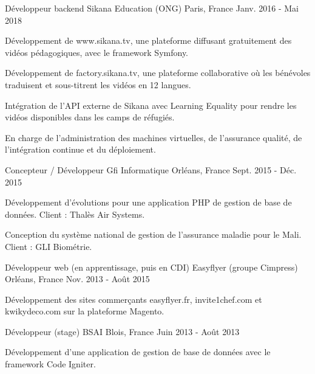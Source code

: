 \begin{cventries}
  \cventry
    {Développeur backend}
    {Sikana Education (ONG)}
    {Paris, France}
    {Janv. 2016 - Mai 2018}
    {
      \begin{cvitems}
        \item {Développement de www.sikana.tv, une plateforme diffusant gratuitement des vidéos pédagogiques, avec le framework Symfony.}
        \item {Développement de factory.sikana.tv, une plateforme collaborative où les bénévoles traduisent et sous-titrent les vidéos en 12 langues.}
        \item {Intégration de l'API externe de Sikana avec Learning Equality pour rendre les vidéos disponibles dans les camps de réfugiés.}
        \item {En charge de l'administration des machines virtuelles, de l'assurance qualité, de l'intégration continue et du déploiement.}
      \end{cvitems}
    }
  \cventry
    {Concepteur / Développeur}
    {Gfi Informatique}
    {Orléans, France}
    {Sept. 2015 - Déc. 2015}
    {
      \begin{cvitems}
        \item {Développement d'évolutions pour une application PHP de gestion de base de données. Client : Thalès Air Systems.}
        \item {Conception du système national de gestion de l'assurance maladie pour le Mali. Client : GLI Biométrie.}
      \end{cvitems}
    }
  \cventry
    {Développeur web (en apprentissage, puis en CDI)}
    {Easyflyer (groupe Cimpress)}
    {Orléans, France}
    {Nov. 2013 - Août 2015}
    {
      \begin{cvitems}
        \item {Développement des sites commerçants easyflyer.fr, invite1chef.com et kwikydeco.com sur la plateforme Magento.}
      \end{cvitems}
    }
  \cventry
    {Développeur (stage)}
    {BSAI}
    {Blois, France}
    {Juin 2013 - Août 2013}
    {
      \begin{cvitems}
        \item {Développement d'une application de gestion de base de données avec le framework Code Igniter.}
      \end{cvitems}
    }
\end{cventries}

